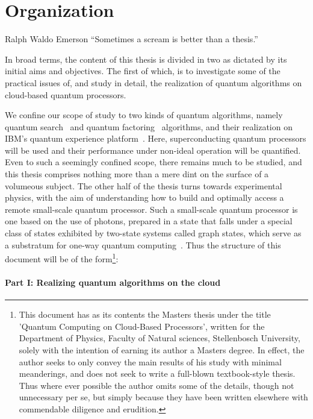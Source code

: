 \section{Organization}

\begin{epigram}{Ralph Waldo Emerson}
\noindent \enquote{Sometimes a scream is better than a thesis.}
\end{epigram}


\noindent
In broad terms, the content of this thesis is divided in two as dictated by its initial aims and objectives. The first of which, is to investigate some of the practical issues of, and study in detail, the realization of quantum algorithms on cloud-based quantum processors. 

\clearpage
\noindent
We confine our scope of study to two kinds of quantum algorithms, namely quantum search~\cite{Grover_1997} and quantum factoring~\cite{Shor_1997} algorithms, and their realization on IBM's quantum experience platform~\cite{IBMQ}. Here, superconducting quantum processors will be used and their performance under non-ideal operation will be quantified. Even to such a seemingly confined scope, there remains much to be studied, and this thesis comprises nothing more than a mere dint on the surface of a volumeous subject. The other half of the thesis turns towards experimental physics, with the aim of understanding how to build and optimally access a remote small-scale quantum processor. Such a small-scale quantum processor is one based on the use of photons, prepared in a state that falls under a special class of states exhibited by two-state systems called graph states, which serve as a substratum for one-way quantum computing~\cite{Walther_2005}. Thus the structure of this document will be of the form\footnote{This document has as its contents the Masters thesis under the title 'Quantum Computing on Cloud-Based Processors', written for the Department of Physics, Faculty of Natural sciences, Stellenbosch University, solely with the intention of earning its author a Masters degree. In effect, the author seeks to only convey the main results of his study with minimal meanderings, and does not seek to write a full-blown textbook-style thesis. Thus where ever possible the author omits some of the details, though not unnecessary per se, but simply because they have been written  elsewhere with commendable diligence and erudition.}:

\paragraph{Part I: Realizing quantum algorithms on the cloud}

